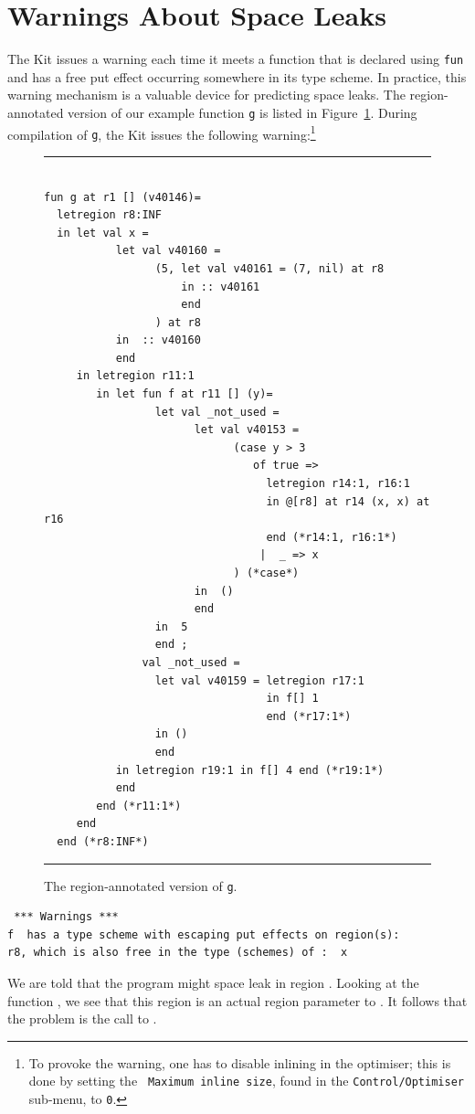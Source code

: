 \documentclass[12pt]{book}
\begin{document}
\section{Warnings About Space Leaks}
The Kit issues a warning each time it meets a 
function that is declared using {\tt fun} and has a free put 
effect occurring somewhere in its type
scheme. In practice, this warning mechanism is a
valuable device for predicting space leaks. 
The region-annotated version of our example function {\tt g} is listed in
Figure~\ref{escape_mulexp.fig}. During compilation of {\tt g}, the Kit issues the
following warning:\footnote{To provoke the warning, one has to disable
inlining in the {\Lam} optimiser; this is done by setting the {\tt
    Maximum inline size}, found in the 
        {\tt Control/Optimiser} sub-menu, to {\tt 0}.}
\begin{figure}
\hrule
\begin{verbatim}

fun g at r1 [] (v40146)= 
  letregion r8:INF 
  in let val x = 
           let val v40160 = 
                 (5, let val v40161 = (7, nil) at r8 
                     in :: v40161 
                     end 
                 ) at r8
           in  :: v40160
           end 
     in letregion r11:1 
        in let fun f at r11 [] (y)= 
                 let val _not_used = 
                       let val v40153 = 
                             (case y > 3 
                                of true => 
                                  letregion r14:1, r16:1 
                                  in @[r8] at r14 (x, x) at r16 
                                  end (*r14:1, r16:1*)
                                 |  _ => x
                             ) (*case*) 
                       in  ()
                       end 
                 in  5
                 end ; 
               val _not_used = 
                 let val v40159 = letregion r17:1 
                                  in f[] 1 
                                  end (*r17:1*) 
                 in () 
                 end 
           in letregion r19:1 in f[] 4 end (*r19:1*)
           end  
        end (*r11:1*)
     end  
  end (*r8:INF*)
\end{verbatim}
\caption{The region-annotated version of {\tt g}.}
\medskip
\hrule
\label{escape_mulexp.fig}
\end{figure}

\begin{verbatim}
 *** Warnings ***
f  has a type scheme with escaping put effects on region(s): 
r8, which is also free in the type (schemes) of :  x
\end{verbatim}
We are told that the program might space
leak in region . Looking at the 
function , we see that this region is an actual
region parameter to . It follows that the problem is the
call to .
\end{document}
